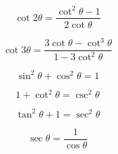 \[\begin{equation} \cot 2\theta = \frac{\cot^2 \theta - 1}{2 \cot \theta} \end{equation}\]

\[\begin{equation} \cot 3\theta = \frac{3 \cot\theta - \cot^3\theta}{1 - 3 \cot^2\theta} \end{equation}\]

\[\begin{equation} \sin^2 \theta + \cos^2 \theta = 1 \end{equation}\]

\[\begin{equation} 1 + \cot^2 \theta = \csc^2 \theta \end{equation}\]

\[\begin{equation} \tan^2 \theta + 1 = \sec^2 \theta \end{equation}\]

\[\begin{equation} \sec\theta= \frac{1}{\cos \theta} \end{equation}\]

